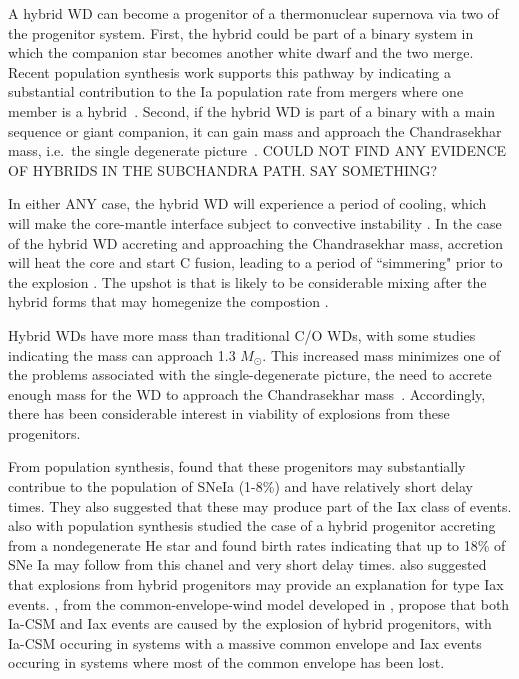 \documentclass[iop,apj]{emulateapj}
\newcommand{\Msun}{\ensuremath{M_\odot}}
\begin{document}
A hybrid WD can become a progenitor of a thermonuclear supernova via two 
of the progenitor system. 
First, the hybrid could be part of a binary system in which the companion star becomes
another white dwarf and the two merge. Recent population synthesis work supports
this pathway by indicating a substantial contribution to the Ia population rate from 
mergers where one member is a hybrid~\citep{yungelsonkuranov2017}. Second, if the hybrid 
WD is part of a binary with a main sequence or giant companion, it can gain mass and 
approach the Chandrasekhar mass, i.e.\  the single degenerate picture~\citep{willcoxetal2016}. 
{\color{red} COULD NOT FIND ANY EVIDENCE OF HYBRIDS IN THE SUBCHANDRA PATH. SAY 
SOMETHING?}

In either {\color{red}ANY} case, the hybrid WD will experience a period of cooling, which will
make the core-mantle interface subject to convective 
instability \citep{brooksetal2017,schwabgaraud2018}. In the case of the 
hybrid WD accreting and approaching the Chandrasekhar mass, accretion will
heat the core and start C fusion, leading to a period of ``simmering" prior
to the explosion \citep{PiroBild08}. The upshot is that is likely to be considerable
mixing after the hybrid forms that may homegenize the compostion 
\citep{denissenkovetal2015,brooksetal2017,schwabgaraud2018}.

Hybrid WDs have more mass than traditional C/O WDs, with some studies indicating the
mass can approach 1.3 \Msun \citep{chenetal2014}. This increased mass
minimizes one of the problems associated with the single-degenerate picture,
the need to accrete enough mass for the WD to approach the Chandrasekhar
mass~\citep{chenetal2014,denissenkovetal2015,kromeretal2015}.
Accordingly, there has been considerable interest in viability of explosions from 
these progenitors. 

From population synthesis, \citet{mengpods2014} found that these
progenitors may substantially contribue to the population of SNeIa (1-8\%) and have
relatively short delay times. They also suggested that these 
may produce part of the Iax class of events. \citet{Wangetal2014} also with population
synthesis studied the case
of a hybrid progenitor accreting from a nondegenerate He star and found
birth rates indicating that up to 18\% of SNe Ia may follow from this chanel
and very short delay times. \citet{Wangetal2014} also suggested that explosions 
from hybrid progenitors may provide an explanation for type Iax events.
\citet{mengpods2018}, from the common-envelope-wind model developed in 
\citep{mengpods2014}, propose that both Ia-CSM and Iax events 
are caused by the explosion of hybrid progenitors, with Ia-CSM occuring in systems with 
a massive common envelope and Iax events occuring in systems where most of the common envelope
has been lost.
\end{document}
